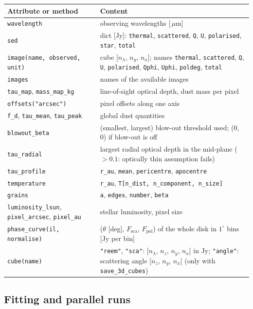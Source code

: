 \documentclass[11pt,a4paper]{article}
\newcommand{\code}[1]{\texttt{#1}}
\newcommand{\um}{\,$\mu$m}
\begin{document}
\small
\begin{longtable}{@{}R{5.6cm}R{9.3cm}@{}}
\toprule
Attribute or method & Content \\
\midrule
\endhead
\code{wavelength} & observing wavelengths [\um] \\
\code{sed} & dict [Jy]: \code{thermal}, \code{scattered}, \code{Q}, \code{U}, \code{polarised},
  \code{star}, \code{total} \\
\code{image(name, observed, unit)} & cube [$n_\lambda$, $n_y$, $n_x$]; names \code{thermal},
  \code{scattered}, \code{Q}, \code{U}, \code{polarised}, \code{Qphi}, \code{Uphi},
  \code{poldeg}, \code{total} \\
\code{images} & names of the available images \\
\code{tau\_map}, \code{mass\_map\_kg} & line-of-sight optical depth, dust mass per pixel \\
\code{offsets("arcsec")} & pixel offsets along one axis \\
\code{f\_d}, \code{tau\_mean}, \code{tau\_peak} & global dust quantities \\
\code{blowout\_beta} & (smallest, largest) blow-out threshold used; (0, 0) if blow-out is off \\
\code{tau\_radial} & largest radial optical depth in the mid-plane ($>0.1$: optically thin
  assumption fails) \\
\code{tau\_profile} & \code{r\_au}, \code{mean}, \code{pericentre}, \code{apocentre} \\
\code{temperature} & \code{r\_au}, \code{T[n\_dist, n\_component, n\_size]} \\
\code{grains} & \code{a}, \code{edges}, \code{number}, \code{beta} \\
\code{luminosity\_lsun}, \code{pixel\_arcsec}, \code{pixel\_au} & stellar luminosity, pixel size \\
\code{phase\_curve(il, normalise)} & ($\theta$ [deg], $F_\mathrm{sca}$, $F_\mathrm{pol}$) of the
  whole disk in $1^\circ$ bins [Jy per bin] \\
\code{cube(name)} & \code{"reem"}, \code{"sca"}: [$n_\lambda$, $n_z$, $n_y$, $n_x$] in Jy;
  \code{"angle"}: scattering angle [$n_z$, $n_y$, $n_x$] (only with \code{save\_3d\_cubes}) \\
\bottomrule
\end{longtable}
\normalsize

\subsection{Fitting and parallel runs}
\end{document}
